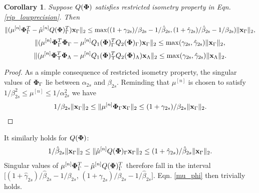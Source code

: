 \documentclass[article]{imsart}
\newtheorem{corollary}{Corollary}
\begin{document}
\begin{corollary}\label{corollary_auxiliary_results}
Suppose $Q(\boldsymbol{{\bf \Phi}})$ satisfies restricted isometry property in Eqn. \ref{rip_lowprecision}. Then
\begin{equation}\label{mu_phi}
    \| ({\mu}^{[n]}{\bf {\bf \Phi}}_{\Gamma}^T-\hat{\mu}^{[n]}Q({\bf {\bf \Phi}})_{\Gamma}^T){\bf x}_{\Gamma}\|_2 \leq \rm{max}(({1+\gamma_{2s}})/{\beta_{2s}}-{1}/{\hat{\beta}_{2s}}, ({1+\hat{\gamma}_{2s}})/{\hat{\beta}_{2s}}-{1}/{\beta_{2s}})\| {\bf x}_{\Gamma}\|_2,
\end{equation} 
\begin{equation}\label{mu_phi2}
    \|( \mu^{[n]}{\bf \Phi}_{\Gamma}^T\boldsymbol{\Phi}_{\Gamma} - \mu^{[n]}Q_1(\boldsymbol{\Phi})_{\Gamma}^TQ_2(\boldsymbol{\Phi})_{\Gamma}){\bf x}_{\Gamma}\|_2 \leq \rm{max}(\gamma_{2s}, \hat{\gamma}_{2s})\| {\bf x}_{\Gamma}\|_2,
\end{equation}
\begin{equation}\label{mu_phi2_diff}
    \| (\mu^{[n]}\boldsymbol{\Phi}_{\Upsilon}^T\boldsymbol{\Phi}_{\Lambda} - \mu^{[n]}Q_1(\boldsymbol{\Phi})_{\Upsilon}^TQ_2(\boldsymbol{\Phi})_{\Lambda}){\bf x}_{\Lambda}\|_2 \leq \rm{max}(\gamma_{2s}, \hat{\gamma}_{2s})\| {\bf x}_{\Lambda}\|_2.
\end{equation}
\end{corollary}
\begin{proof}
As a simple consequence of restricted isometry property, the singular values of ${\bf \Phi}_{\Gamma}$ lie between $\alpha_{2s}$ and $\beta_{2s}$. Reminding that $\mu^{[n]}$ is chosen to satisfy $1/\beta^2_{2s}\leq \mu^{[n]}\leq 1/\alpha^2_{2s}$ we have
\begin{equation}
\begin{aligned}
   1/\beta_{2s} \| {\bf x}_{\Gamma}\|_2\leq \|{\mu}^{[n]}{\bf {\bf \Phi}}_{\Gamma} {\bf x}_{\Gamma}\|_2\leq (1+\gamma_{2s})/\beta_{2s}\| {\bf x}_{\Gamma}\|_2.
\end{aligned}
\end{equation}
\end{proof}
It similarly holds for $Q(\boldsymbol{{\bf \Phi}})$:
\begin{equation}
\begin{aligned}
   1/\hat{\beta}_{2s} \| {\bf x}_{\Gamma}\|_2\leq \|{\hat{\mu}}^{[n]}Q({\bf {\bf \Phi}})_{\Gamma} {\bf x}_{\Gamma}\|_2\leq (1+\hat{\gamma}_{2s})/\hat{\beta}_{2s}\| {\bf x}_{\Gamma}\|_2.
\end{aligned}
\end{equation}
Singular values of ${\mu}^{[n]}{\bf {\bf \Phi}}_{\Gamma}^T-\hat{\mu}^{[n]}Q({\bf {\bf \Phi}})_{\Gamma}^T$ therefore fall in the interval $[({1+\hat{\gamma}_{2s}})/{\hat{\beta}_{2s}}-{1}/{\beta_{2s}}$, $({1+\gamma_{2s}})/{\beta_{2s}}-{1}/{\hat{\beta}_{2s}}]$. Eqn. \ref{mu_phi} then trivially holds.
\end{document}
